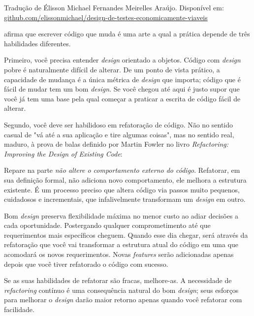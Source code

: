 
Tradução de Élisson Michael Fernandes Meirelles Araújo. Disponível em: \url{github.com/elissonmichael/design-de-testes-economicamente-viaveis}

\cite{Sandi} afirma que escrever código que muda é uma arte a qual a prática depende de três habilidades diferentes.

Primeiro, você precisa entender \textit{design} orientado a objetos. Código com \textit{design} pobre é naturalmente difícil de alterar. De um ponto de vista prático, a capacidade de mudança é a única métrica de \textit{design} que importa; código que é fácil de mudar tem um bom \textit{design}. Se você chegou até aqui é justo supor que você já tem uma base pela qual começar a praticar a escrita de código fácil de alterar.

Segundo, você deve ser habilidoso em refatoração de código. Não no sentido casual de "vá até a sua aplicação e tire algumas coisas", mas no sentido real, maduro, à prova de balas definido por Martin Fowler no livro \textit{Refactoring: Improving the Design of Existing Code}\cite{Fowler1999}:


Repare na parte \textit{não altere o comportamento externo do código}. Refatorar, em sua definição formal, não adiciona novo comportamento, ele melhora a estrutura existente. É um processo preciso que altera código via passos muito pequenos, cuidadosos e incrementais, que infalivelmente transformam um \textit{design} em outro.

Bom \textit{design} preserva flexibilidade máxima no menor custo ao adiar decisões a cada oportunidade. Postergando qualquer comprometimento até que requerimentos mais específicos cheguem. Quando esse dia chegar, será através da refatoração que você vai transformar a estrutura atual do código em uma que acomodará os novos requerimentos. Novas \textit{features} serão adicionadas apenas depois que você tiver refatorado o código com sucesso.

Se as suas habilidades de refatorar são fracas, melhore-as. A necessidade de  \textit{refactoring} contínuo é uma consequência natural do bom \textit{design}; seus esforços para melhorar o \textit{design} darão maior retorno apenas quando você refatorar com facilidade.

